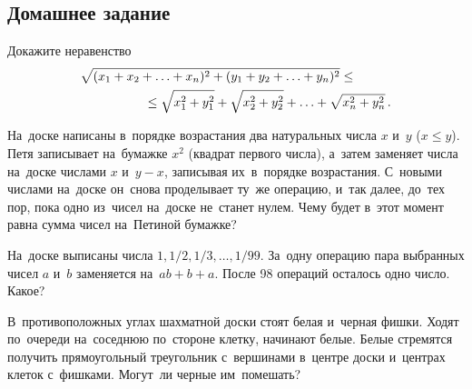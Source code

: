 

\subsection*{Домашнее задание}



\begin{problems}

\item
Докажите неравенство
\begin{align*}
    \hspace{5em}&\hspace{-5em}
    \sqrt{(x_1 + x_2 + \ldots + x_n)^2 + (y_1 + y_2 + \ldots + y_n)^2}
\leq\\&{}\leq
    \sqrt{x_1^2 + y_1^2} + \sqrt{x_2^2 + y_2^2}
    + \ldots +
    \sqrt{x_n^2 + y_n^2}
\, . \end{align*}

\item
На~доске написаны в~порядке возрастания два натуральных числа $x$ и~$y$
($x \leq y$).
Петя записывает на~бумажке $x^2$ (квадрат первого числа), а~затем заменяет
числа на~доске числами $x$ и~$y - x$, записывая их~в~порядке возрастания.
С~новыми числами на~доске он~снова проделывает ту~же операцию, и~так далее,
до~тех пор, пока одно из~чисел на~доске не~станет нулем.
Чему будет в~этот момент равна сумма чисел на~Петиной бумажке?

\item
На~доске выписаны числа $1, 1/2, 1/3, \ldots, 1/99$.
За~одну операцию пара выбранных чисел $a$ и~$b$ заменяется на~$a b + b + a$.
После 98 операций осталось одно число.
Какое?

\item
В~противоположных углах шахматной доски стоят белая и~черная фишки.
Ходят по~очереди на~соседнюю по~стороне клетку, начинают белые.
Белые стремятся получить прямоугольный треугольник с~вершинами в~центре доски
и~центрах клеток с~фишками.
Могут~ли черные им~помешать?

\end{problems}

